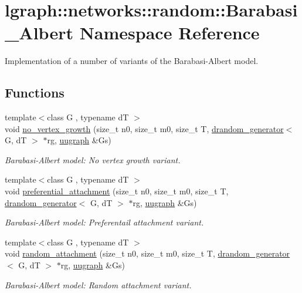 \hypertarget{namespacelgraph_1_1networks_1_1random_1_1Barabasi__Albert}{}\section{lgraph\+:\+:networks\+:\+:random\+:\+:Barabasi\+\_\+\+Albert Namespace Reference}
\label{namespacelgraph_1_1networks_1_1random_1_1Barabasi__Albert}


Implementation of a number of variants of the Barabasi-\/\+Albert model.  


\subsection*{Functions}
\begin{DoxyCompactItemize}
\item 
{\footnotesize template$<$class G , typename dT $>$ }\\void \hyperlink{namespacelgraph_1_1networks_1_1random_1_1Barabasi__Albert_a96015bc94f64c7318d8ed1dc7c4d693a}{no\+\_\+vertex\+\_\+growth} (size\+\_\+t n0, size\+\_\+t m0, size\+\_\+t T, \hyperlink{classlgraph_1_1utils_1_1drandom__generator}{drandom\+\_\+generator}$<$ G, dT $>$ $\ast$rg, \hyperlink{classlgraph_1_1utils_1_1uugraph}{uugraph} \&Gs)
\begin{DoxyCompactList}\small\item\em Barabasi-\/\+Albert model\+: No vertex growth variant. \end{DoxyCompactList}\item 
{\footnotesize template$<$class G , typename dT $>$ }\\void \hyperlink{namespacelgraph_1_1networks_1_1random_1_1Barabasi__Albert_ad3e023275ef249a81b7402294569d3f9}{preferential\+\_\+attachment} (size\+\_\+t n0, size\+\_\+t m0, size\+\_\+t T, \hyperlink{classlgraph_1_1utils_1_1drandom__generator}{drandom\+\_\+generator}$<$ G, dT $>$ $\ast$rg, \hyperlink{classlgraph_1_1utils_1_1uugraph}{uugraph} \&Gs)
\begin{DoxyCompactList}\small\item\em Barabasi-\/\+Albert model\+: Preferentail attachment variant. \end{DoxyCompactList}\item 
{\footnotesize template$<$class G , typename dT $>$ }\\void \hyperlink{namespacelgraph_1_1networks_1_1random_1_1Barabasi__Albert_a5d60b1b18d37c7dd708c743fcf69d9ed}{random\+\_\+attachment} (size\+\_\+t n0, size\+\_\+t m0, size\+\_\+t T, \hyperlink{classlgraph_1_1utils_1_1drandom__generator}{drandom\+\_\+generator}$<$ G, dT $>$ $\ast$rg, \hyperlink{classlgraph_1_1utils_1_1uugraph}{uugraph} \&Gs)
\begin{DoxyCompactList}\small\item\em Barabasi-\/\+Albert model\+: Random attachment variant. \end{DoxyCompactList}\end{DoxyCompactItemize}


